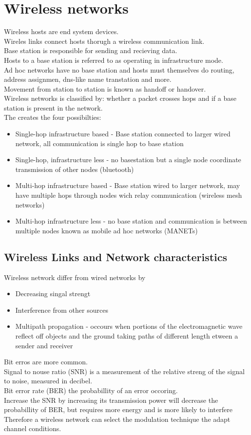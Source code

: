 \documentclass[12pt, a4paper]{article}
\begin{document}
	\section{Wireless networks}
		Wireless hosts are end system devices.\\
		Wireles links connect hosts thorugh a wireless communication link.\\
		Base station is responsible for sending and recieving data.\\
		Hosts to a base station is referred to as operating in infrastructure mode.\\
		Ad hoc networks have no base station and hosts must themselves do routing, address assignmen, dns-like name transtation and more.\\
		Movement from station to station is known as handoff or handover.\\
		Wireless networks is classified by: whether a packet crosses hops and if a base station is present in the network.\\
		The creates the four possibilties:
		\begin{itemize}
			\item Single-hop infrastructure based - Base station connected to larger wired network, all communication is single hop to base station
			\item Single-hop, infrastructure less - no basestation but a single node coordinate transmission of other nodes (bluetooth)
			\item Multi-hop infrastructure based - Base station wired to larger network, may have multiple hops through nodes wich relay communication (wireless mesh networks)
			\item Multi-hop infrastructure less - no base station and communication is between multiple nodes known as mobile ad hoc networks (MANETs)
		\end{itemize}
		\subsection{Wireless Links and Network characteristics}
			Wireless network differ from wired networks by
			\begin{itemize}
				\item Decreasing singal strengt
				\item Interference from other sources
				\item Multipath propagation - occours when portions of the electromagnetic wave reflect off objects and the ground taking paths of different length etween a sender and receiver
			\end{itemize}
			Bit erros are more common.\\
			Signal to nouse ratio (SNR) is a measurement of the relative streng of the signal to noise, measured in decibel.\\
			Bit error rate (BER) the probabillity of an error occoring.\\
			Increase the SNR by increasing its transmission power will decrease the probabillity of BER, but requires more energy and is more likely to interfere\\
			Therefore a wireless network can select the modulation technique the adapt channel conditions.\\
\end{document}
